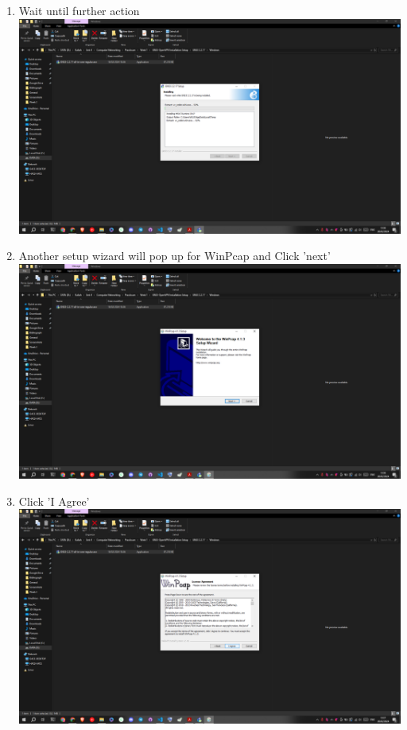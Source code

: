 \documentclass[12pt,titlepage]{article}
\begin{document}
\begin{enumerate}
    \item Wait until further action \\ \includegraphics[width=.9\textwidth]{images/figures/Screenshot (429).png}
    \item Another setup wizard will pop up for WinPcap and Click 'next' \\ \includegraphics[width=.9\textwidth]{images/figures/Screenshot (430).png}
    \newpage
    \item Click 'I Agree' \\ \includegraphics[width=.9\textwidth]{images/figures/Screenshot (431).png}

\end{enumerate}
\end{document}
